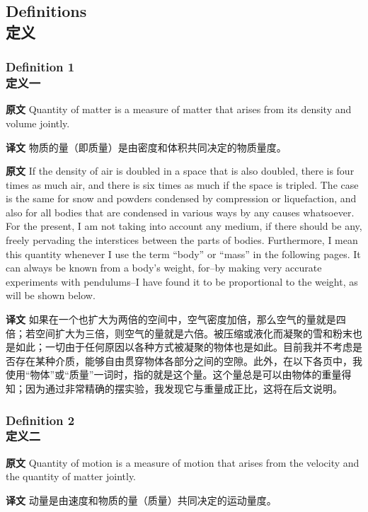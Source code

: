 \documentclass[UTF8,zihao=-4]{ctexart}
\begin{document}
\subsection*{Definitions\\定义}

\subsubsection*{Definition 1\\定义一}
\noindent\textbf{原文} Quantity of matter is a measure of matter that arises from its density and volume jointly.
\par\noindent\textbf{译文} 物质的量（即质量）是由密度和体积共同决定的物质量度。
\medskip

\noindent\textbf{原文} If the density of air is doubled in a space that is also doubled, there is four times as much air, and there is six times as much if the space is tripled. The case is the same for snow and powders condensed by compression or liquefaction, and also for all bodies that are condensed in various ways by any causes whatsoever. For the present, I am not taking into account any medium, if there should be any, freely pervading the interstices between the parts of bodies. Furthermore, I mean this quantity whenever I use the term ``body'' or ``mass'' in the following pages. It can always be known from a body's weight, for--by making very accurate experiments with pendulums--I have found it to be proportional to the weight, as will be shown below.
\par\noindent\textbf{译文} 如果在一个也扩大为两倍的空间中，空气密度加倍，那么空气的量就是四倍；若空间扩大为三倍，则空气的量就是六倍。被压缩或液化而凝聚的雪和粉末也是如此；一切由于任何原因以各种方式被凝聚的物体也是如此。目前我并不考虑是否存在某种介质，能够自由贯穿物体各部分之间的空隙。此外，在以下各页中，我使用“物体”或“质量”一词时，指的就是这个量。这个量总是可以由物体的重量得知；因为通过非常精确的摆实验，我发现它与重量成正比，这将在后文说明。
\medskip

\subsubsection*{Definition 2\\定义二}
\noindent\textbf{原文} Quantity of motion is a measure of motion that arises from the velocity and the quantity of matter jointly.
\par\noindent\textbf{译文} 动量是由速度和物质的量（质量）共同决定的运动量度。
\medskip
\end{document}
